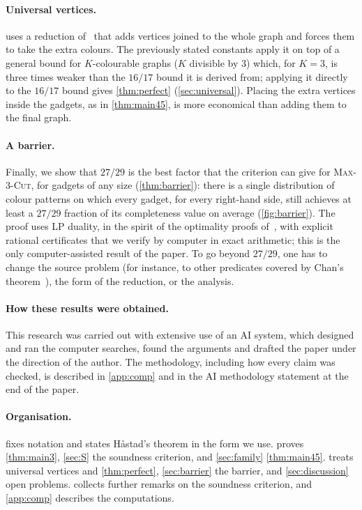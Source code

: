 \documentclass[11pt,letterpaper]{article}
\theoremstyle{remark}
\newcommand{\MC}[1]{\textup{\textsc{Max-$#1$-Cut}}}
\begin{document}
\paragraph{Universal vertices.}
 uses a reduction of~\cite{KKLP97,GS13} that adds vertices joined to the whole graph
and forces them to take the extra colours. The previously stated constants apply it on top of a general
bound for $K$-colourable graphs ($K$ divisible by $3$) which, for $K=3$, is three times weaker than the
$16/17$ bound it is derived from; applying it directly to the $16/17$ bound gives \cref{thm:perfect}
(\cref{sec:universal}). Placing the extra vertices
inside the gadgets, as in \cref{thm:main45}, is more economical than adding them to the final graph.

\paragraph{A barrier.}
Finally, we show that $27/29$ is the best factor that the criterion can give for \MC{3}, for gadgets of
any size (\cref{thm:barrier}): there is a single distribution of colour patterns on which every gadget,
for every right-hand side, still achieves at least a $27/29$ fraction of its completeness value on
average (\cref{fig:barrier}). The proof uses LP
duality, in the spirit of the optimality proofs of~\cite{TSSW00,HHMOW17}, with explicit rational
certificates that we verify by computer in exact arithmetic; this is the only computer-assisted result
of the paper. To go beyond $27/29$, one has to change the source problem (for instance, to other
predicates covered by Chan's theorem~\cite{Chan16}), the form of the reduction, or the analysis.

\paragraph{How these results were obtained.}
This research was carried out with extensive use of an AI system, which designed and ran the computer
searches, found the arguments and drafted the paper under the direction of the author. The methodology,
including how every claim was checked, is described in \cref{app:comp} and in the AI methodology
statement at the end of the paper.

\paragraph{Organisation.}
 fixes notation and states H\aa stad's theorem in the form we use.  proves
\cref{thm:main3}, \cref{sec:S} the soundness criterion, and \cref{sec:family} \cref{thm:main45}.
 treats universal vertices and \cref{thm:perfect}, \cref{sec:barrier} the barrier, and
\cref{sec:discussion} open problems.  collects further remarks on the soundness criterion,
and \cref{app:comp} describes the computations.
\end{document}
